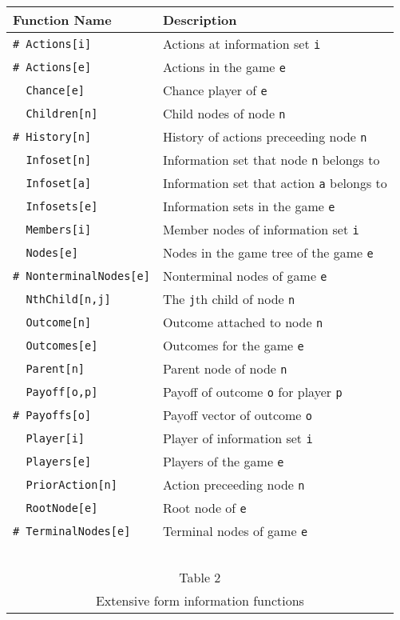 \begin{table}[htp]
\begin{center}
\begin{tabular} {|l||l|} \hline
Function Name	& Description \\ 
\hline
\verb+# Actions[i]+ & Actions at information set \verb+i+ \\
\verb+# Actions[e]+ & Actions in the game \verb+e+ \\
\verb+  Chance[e]+ & Chance player of \verb+e+ \\
\verb+  Children[n]+ & Child nodes of node \verb+n+ \\
\verb+# History[n]+ & History of actions preceeding node \verb+n+ \\
\verb+  Infoset[n]+ & Information set that node \verb+n+ belongs to\\
\verb+  Infoset[a]+ & Information set that action \verb+a+ belongs to\\
\verb+  Infosets[e]+ & Information sets in the game \verb+e+\\
\verb+  Members[i]+ & Member nodes of information set \verb+i+\\
\verb+  Nodes[e]+ & Nodes in the game tree of the game \verb+e+\\
\verb+# NonterminalNodes[e]+ & Nonterminal nodes of game \verb+e+\\
\verb+  NthChild[n,j]+ & The \verb+j+th child of node \verb+n+ \\
\verb+  Outcome[n]+ & Outcome attached to node \verb+n+ \\
\verb+  Outcomes[e]+ & Outcomes for the game \verb+e+ \\
\verb+  Parent[n]+ & Parent node of node \verb+n+ \\
\verb+  Payoff[o,p]+ & Payoff  of outcome \verb+o+ for player \verb+p+ \\
\verb+# Payoffs[o]+ & Payoff vector of outcome \verb+o+ \\
\verb+  Player[i]+ & Player of information set \verb+i+ \\
\verb+  Players[e]+ & Players of the game \verb+e+ \\
\verb+  PriorAction[n]+ & Action preceeding node \verb+n+ \\
\verb+  RootNode[e]+ & Root node of \verb+e+ \\
\verb+# TerminalNodes[e]+ & Terminal nodes of game \verb+e+\\
\hline
\multicolumn{2}{c}{\ }\\
\multicolumn{2}{c}{Table 2}\\
\multicolumn{2}{c}{Extensive form information functions}\\
\end{tabular}
\end{center}
\end{table}
\medskip

